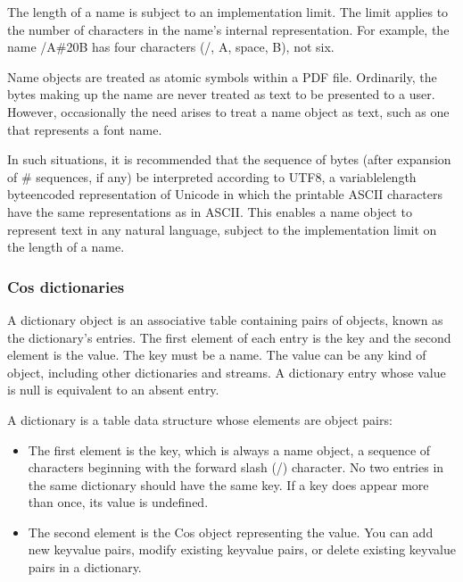 \documentclass[letterpaper,12pt,english,openany,oneside]{sphinxmanual}
\begin{document}
The length of a name is subject to an implementation limit. The limit applies to the number of characters in the name’s internal representation. For example, the name /A\#20B has four characters (/, A, space, B), not six.

Name objects are treated as atomic symbols within a PDF file. Ordinarily, the bytes making up the name are never treated as text to be presented to a user. However, occasionally the need arises to treat a name object as text, such as one that represents a font name.

In such situations, it is recommended that the sequence of bytes (after expansion of \# sequences, if any) be interpreted according to UTF\sphinxhyphen{}8, a variable\sphinxhyphen{}length byte\sphinxhyphen{}encoded representation of Unicode in which the printable ASCII characters have the same representations as in ASCII. This enables a name object to represent text in any natural language, subject to the implementation limit on the length of a name.


\subsubsection{Cos dictionaries}
\label{\detokenize{Plugins_Cos:cos-dictionaries}}
A dictionary object is an associative table containing pairs of objects, known as the dictionary’s entries. The first element of each entry is the key and the second element is the value. The key must be a name. The value can be any kind of object, including other dictionaries and streams. A dictionary entry whose value is null is equivalent to an absent entry.

A dictionary is a table data structure whose elements are object pairs:
\begin{itemize}
\item {} 
The first element is the key, which is always a name object, a sequence of characters beginning with the forward slash (/) character. No two entries in the same dictionary should have the same key. If a key does appear more than once, its value is undefined.

\item {} 
The second element is the Cos object representing the value. You can add new key\sphinxhyphen{}value pairs, modify existing key\sphinxhyphen{}value pairs, or delete existing key\sphinxhyphen{}value pairs in a dictionary.

\end{itemize}
\end{document}
